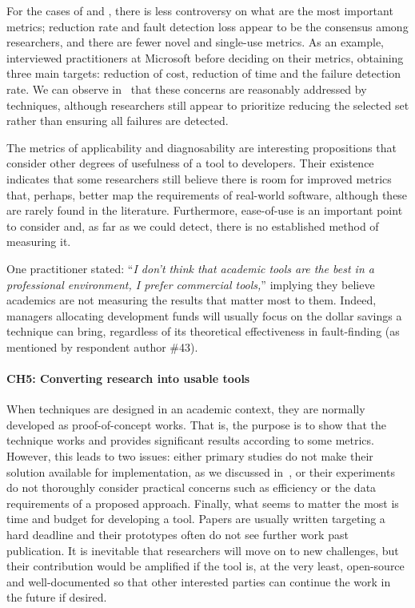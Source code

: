 For the cases of \tcs and \tsr, there is less controversy on what are the most important metrics; reduction rate and fault detection loss appear to be the consensus among researchers, and there are fewer novel and single-use metrics.
As an example,~ interviewed practitioners at Microsoft before deciding on their \tcs metrics, obtaining three main targets: reduction of cost, reduction of time and the failure detection rate.
We can observe in~ that these concerns are reasonably addressed by \tcs techniques, although researchers still appear to prioritize reducing the selected set rather than ensuring all failures are detected.

The metrics of applicability and diagnosability  are interesting propositions that consider other degrees of usefulness of a tool to developers.
Their existence indicates that some researchers still believe there is room for improved metrics that, perhaps, better map the requirements of real-world software, although these are rarely found in the literature.
Furthermore, ease-of-use is an important point to consider and, as far as we could detect, there is no established method of measuring it.

One practitioner stated: ``\textit{I don't think that academic tools are the best in a professional environment, I prefer commercial tools,}'' implying they believe academics are not measuring the results that matter most to them.
Indeed, managers allocating development funds will usually focus on the dollar savings a technique can bring, regardless of its theoretical effectiveness in fault-finding (as mentioned by respondent author \#43).

\paragraph{CH5: Converting research into usable tools}
When techniques are designed in an academic context, they are normally developed as proof-of-concept works.
That is, the purpose is to show that the technique works and provides significant results according to some metrics.
However, this leads to two issues: either primary studies do not make their solution available for implementation, as we discussed in~, or their experiments do not thoroughly consider practical concerns such as efficiency or the data requirements of a proposed approach.
Finally, what seems to matter the most is time and budget for developing a tool.
Papers are usually written targeting a hard deadline and their prototypes often do not see further work past publication.
It is inevitable that researchers will move on to new challenges, but their contribution would be amplified if the tool is, at the very least, open-source and well-documented so that other interested parties can continue the work in the future if desired.

